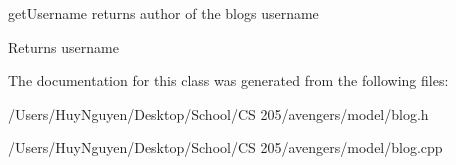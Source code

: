 get\+Username returns author of the blog\textquotesingle{}s username 

\begin{DoxyReturn}{Returns}
username 
\end{DoxyReturn}


The documentation for this class was generated from the following files\+:\begin{DoxyCompactItemize}
\item 
/\+Users/\+Huy\+Nguyen/\+Desktop/\+School/\+C\+S 205/avengers/model/blog.\+h\item 
/\+Users/\+Huy\+Nguyen/\+Desktop/\+School/\+C\+S 205/avengers/model/blog.\+cpp\end{DoxyCompactItemize}
